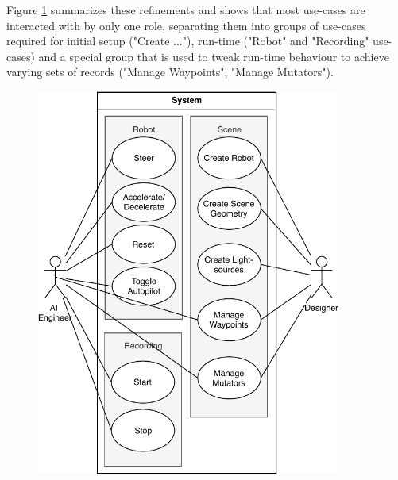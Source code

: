 Figure \ref{fig:use-cases} summarizes these refinements and shows that most use-cases are interacted with by only one role, separating them into groups of use-cases required for initial setup ("Create ..."), run-time ("Robot" and "Recording" use-cases) and a special group that is used to tweak run-time behaviour to achieve varying sets of records ("Manage Waypoints", "Manage Mutators"). 
\begin{figure}
    \centering
    \includegraphics[width=10cm]{tex/img/ch04/UseCases_Fine.pdf}
    \label{fig:use-cases}
\end{figure}
\clearpage

